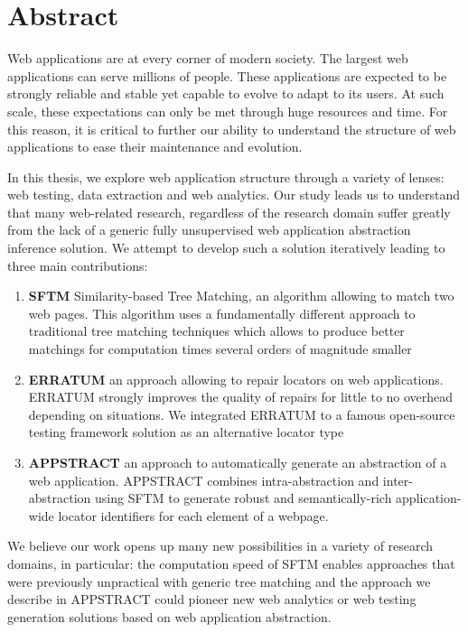 \thispagestyle{empty}
\section*{Abstract}

\begin{doublespace}
Web applications are at every corner of modern society.
The largest web applications can serve millions of people.
These applications are expected to be strongly reliable and stable yet capable to evolve to adapt to its users.
At such scale, these expectations can only be met through huge resources and time. 
For this reason, it is critical to further our ability to understand the structure of web applications to ease their maintenance and evolution.

In this thesis, we explore web application structure through a variety of lenses: web testing, data extraction and web analytics.
Our study leads us to understand that many web-related research, regardless of the research domain suffer greatly from the lack of a generic fully unsupervised web application abstraction inference solution. We attempt to develop such a solution iteratively leading to three main contributions:
\begin{enumerate}
    \item \textbf{SFTM} Similarity-based Tree Matching, an algorithm allowing to match two web pages. This algorithm uses a fundamentally different approach to traditional tree matching techniques which allows to produce better matchings for computation times several orders of magnitude smaller
    \item \textbf{ERRATUM} an approach allowing to repair locators on web applications. ERRATUM strongly improves the quality of repairs for little to no overhead depending on situations. We integrated ERRATUM to a famous open-source testing framework solution as an alternative locator type
    \item \textbf{APPSTRACT} an approach to automatically generate an abstraction of a web application. APPSTRACT combines intra-abstraction and inter-abstraction using SFTM to generate robust and semantically-rich application-wide locator identifiers for each element of a webpage.
\end{enumerate}

We believe our work opens up many new possibilities in a variety of research domains, in particular: the computation speed of SFTM enables approaches that were previously unpractical with generic tree matching and the approach we describe in APPSTRACT could pioneer new web analytics or web testing generation solutions based on web application abstraction.
\end{doublespace}

